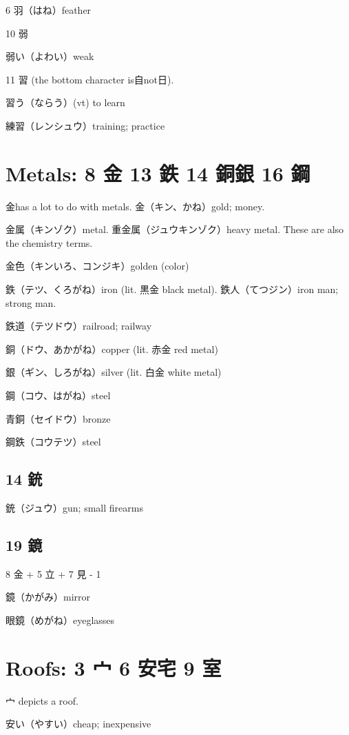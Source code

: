 6 羽（はね）feather

10 弱

弱い（よわい）weak

11 習 (the bottom character is自not日).

習う（ならう）(vt) to learn

練習（レンシュウ）training; practice

\section{Metals: 8 金 13 鉄 14 銅銀 16 鋼}

金has a lot to do with metals.
金（キン、かね）gold; money.

金属（キンゾク）metal.
重金属（ジュウキンゾク）heavy metal.
These are also the chemistry terms.

金色（キンいろ、コンジキ）golden (color)

鉄（テツ、くろがね）iron (lit. 黒金 black metal).
鉄人（てつジン）iron man; strong man.

鉄道（テツドウ）railroad; railway

銅（ドウ、あかがね）copper (lit. 赤金 red metal)

銀（ギン、しろがね）silver (lit. 白金 white metal)

鋼（コウ、はがね）steel

青銅（セイドウ）bronze

鋼鉄（コウテツ）steel

\subsection{14 銃}

銃（ジュウ）gun; small firearms

\subsection{19 鏡}

8 金 + 5 立 + 7 見 - 1

鏡（かがみ）mirror

眼鏡（めがね）eyeglasses

\section{Roofs: 3 宀 6 安宅 9 室}

宀 depicts a roof.

安い（やすい）cheap; inexpensive

